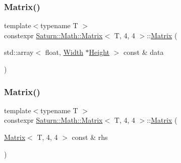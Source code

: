 \subsubsection{\texorpdfstring{Matrix()}{Matrix()}\hspace{0.1cm}{\footnotesize\ttfamily [2/4]}}
{\footnotesize\ttfamily template$<$typename T $>$ \\
constexpr \mbox{\hyperlink{class_saturn_1_1_math_1_1_matrix}{Saturn\+::\+Math\+::\+Matrix}}$<$ T, 4, 4 $>$\+::\mbox{\hyperlink{class_saturn_1_1_math_1_1_matrix}{Matrix}} (\begin{DoxyParamCaption}\item[{std\+::array$<$ float, \mbox{\hyperlink{class_saturn_1_1_math_1_1_matrix_3_01_t_00_014_00_014_01_4_ae0e3e5c9ab2d8f43d74ef1485f2a46aa}{Width}} $\ast$\mbox{\hyperlink{class_saturn_1_1_math_1_1_matrix_3_01_t_00_014_00_014_01_4_a53f3e480546936c7c9d0fa0a6f8d8bda}{Height}} $>$ const \&}]{data }\end{DoxyParamCaption})\hspace{0.3cm}{\ttfamily [inline]}}

\mbox{\label{class_saturn_1_1_math_1_1_matrix_3_01_t_00_014_00_014_01_4_adaba72b263afdbdd2d6f25d65864bfe5}} 
\subsubsection{\texorpdfstring{Matrix()}{Matrix()}\hspace{0.1cm}{\footnotesize\ttfamily [3/4]}}
{\footnotesize\ttfamily template$<$typename T $>$ \\
constexpr \mbox{\hyperlink{class_saturn_1_1_math_1_1_matrix}{Saturn\+::\+Math\+::\+Matrix}}$<$ T, 4, 4 $>$\+::\mbox{\hyperlink{class_saturn_1_1_math_1_1_matrix}{Matrix}} (\begin{DoxyParamCaption}\item[{\mbox{\hyperlink{class_saturn_1_1_math_1_1_matrix}{Matrix}}$<$ T, 4, 4 $>$ const \&}]{rhs }\end{DoxyParamCaption})\hspace{0.3cm}{\ttfamily [inline]}}

\mbox{\label{class_saturn_1_1_math_1_1_matrix_3_01_t_00_014_00_014_01_4_ad8927f9e88fbbd6bee4e5eaeae7a457a}} 
